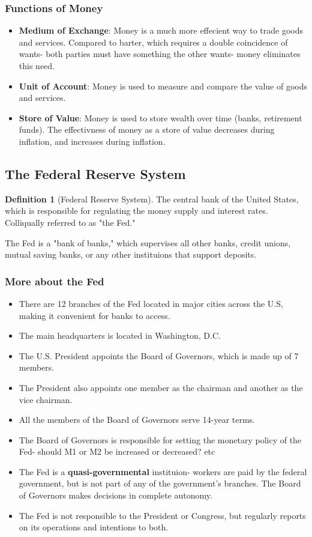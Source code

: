 \documentclass[12pt, a4paper]{article}
\theoremstyle{definition}
\newtheorem{definition}{Definition}
\begin{document}
\subsubsection{Functions of Money}
\begin{itemize}
    \item \textbf{Medium of Exchange}: Money is a much more effecient way to trade goods and services. Compared to barter, which requires a double coincidence of wants- both parties must have something the other wants- money eliminates this need.
    \item \textbf{Unit of Account}: Money is used to measure and compare the value of goods and services.
    \item \textbf{Store of Value}: Money is used to store wealth over time (banks, retirement funds). The effectivness of money as a store of value decreases during inflation, and increases during inflation.
\end{itemize}

\subsection{The Federal Reserve System}
\begin{definition}[Federal Reserve System]
    The central bank of the United States, which is responsible for regulating the money supply and interest rates.
    Colliqually referred to as "the Fed."
\end{definition}

The Fed is a "bank of banks," which supervises all other banks, credit unions, mutual saving banks, or any other instituions that support deposits.

\subsubsection{More about the Fed}
\begin{itemize}
    \item There are 12 branches of the Fed located in major cities across the U.S, making it convenient for banks to access.
    \item The main headquarters is located in Washington, D.C.
    \item The U.S. President appoints the Board of Governors, which is made up of 7 members.
    \item The President also appoints one member as the chairman and another as the vice chairman.
    \item All the members of the Board of Governors serve 14-year terms.
    \item The Board of Governors is responsible for setting the monetary policy of the Fed- should M1 or M2 be increased or decreased? etc
    \item The Fed is a \textbf{quasi-governmental} instituion- workers are paid by the federal government, but is not part of any of the government's branches. The Board of Governors makes decisions in complete autonomy.
    \item The Fed is not responsible to the President or Congress, but regularly reports on its operations and intentions to both.
\end{itemize}
\end{document}
